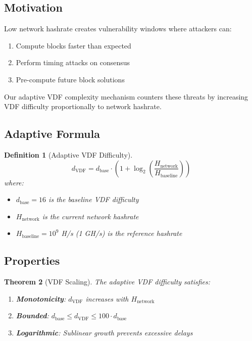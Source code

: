 \documentclass[11pt,a4paper]{article}
\newtheorem{theorem}{Theorem}[section]
\newtheorem{definition}[theorem]{Definition}
\begin{document}
\subsection{Motivation}

Low network hashrate creates vulnerability windows where attackers can:
\begin{enumerate}
    \item Compute blocks faster than expected
    \item Perform timing attacks on consensus
    \item Pre-compute future block solutions
\end{enumerate}

Our adaptive VDF complexity mechanism counters these threats by increasing VDF difficulty proportionally to network hashrate.

\subsection{Adaptive Formula}

\begin{definition}[Adaptive VDF Difficulty]
\begin{equation}
    d_{\text{VDF}} = d_{\text{base}} \cdot \left(1 + \log_2\left(\frac{H_{\text{network}}}{H_{\text{baseline}}}\right)\right)
\end{equation}
where:
\begin{itemize}
    \item $d_{\text{base}} = 16$ is the baseline VDF difficulty
    \item $H_{\text{network}}$ is the current network hashrate
    \item $H_{\text{baseline}} = 10^9$ H/s (1 GH/s) is the reference hashrate
\end{itemize}
\end{definition}

\subsection{Properties}

\begin{theorem}[VDF Scaling]
The adaptive VDF difficulty satisfies:
\begin{enumerate}
    \item \textbf{Monotonicity}: $d_{\text{VDF}}$ increases with $H_{\text{network}}$
    \item \textbf{Bounded}: $d_{\text{base}} \leq d_{\text{VDF}} \leq 100 \cdot d_{\text{base}}$
    \item \textbf{Logarithmic}: Sublinear growth prevents excessive delays
\end{enumerate}
\end{theorem}
\end{document}
